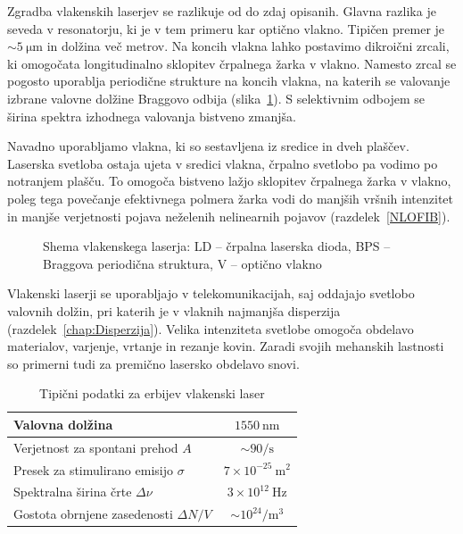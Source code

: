 Zgradba vlakenskih laserjev se razlikuje od do zdaj opisanih. Glavna razlika je
seveda v resonatorju, ki je v tem primeru kar optično vlakno. Tipičen premer je 
$\sim 5~\si{\micro\meter}$ in dolžina več metrov. Na koncih vlakna lahko
postavimo dikroični zrcali, ki omogočata longitudinalno sklopitev črpalnega 
žarka v vlakno. Namesto zrcal se pogosto uporablja periodične strukture 
na koncih vlakna, na katerih se valovanje izbrane valovne dolžine Braggovo odbija
(slika~\ref{fig:Fibshema}). 
S selektivnim odbojem se širina spektra izhodnega valovanja bistveno zmanjša. 

Navadno uporabljamo vlakna, ki so sestavljena iz sredice in dveh plaščev. Laserska
svetloba ostaja ujeta v sredici vlakna, črpalno svetlobo pa vodimo po notranjem plašču. To
omogoča bistveno lažjo sklopitev črpalnega žarka v vlakno, poleg tega povečanje
efektivnega polmera žarka vodi do manjših vršnih intenzitet in manjše verjetnosti
pojava neželenih nelinearnih pojavov (razdelek~\ref{NLOFIB}).

\begin{figure}[h]
\centering
\def\svgwidth{100truemm} 

\caption{Shema vlakenskega laserja: LD -- črpalna laserska dioda, 
BPS -- Braggova periodična struktura, V -- optično vlakno
}
\label{fig:Fibshema}
\end{figure}

Vlakenski laserji se uporabljajo v telekomunikacijah, saj oddajajo svetlobo 
valovnih dolžin, pri katerih je v vlaknih najmanjša disperzija (razdelek~\ref{chap:Disperzija}). 
Velika intenziteta svetlobe omogoča obdelavo materialov, varjenje, vrtanje in rezanje kovin. 
Zaradi svojih mehanskih lastnosti so primerni tudi za premično lasersko obdelavo snovi.

\begin{table}[!h]
\begin{center}
\begin{tabular}{|l|c|}\hline
Valovna dolžina  & $1550~\si{\nano\meter}$\\ \hline
Verjetnost za spontani prehod $A$ & $ \sim 90/\si{\second}$ \\ \hline
Presek za stimulirano emisijo $\sigma$ & $7 \times 10^{-25}~\si{\metre}^2$ \\ \hline
Spektralna širina črte $\Delta \nu$ & $3 \times 10^{12}~\si{\hertz}$  \\ \hline
Gostota obrnjene zasedenosti $\Delta N/V$ & $ \sim 10^{24}/\si{\metre}^3$ \\ \hline
\end{tabular}
\caption{Tipični podatki za erbijev vlakenski laser}
\label{tab:fib}
\end{center}
\end{table}

